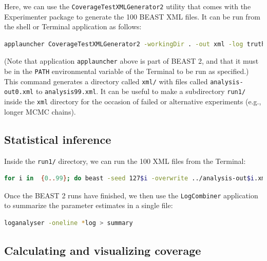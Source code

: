 \documentclass[oneside]{article}
\begin{document}
Here, we can use the \texttt{CoverageTestXMLGenerator2} utility that comes with the Experimenter package to generate the 100 BEAST XML files.
It can be run from the shell or Terminal application as follows:

\vspace{.25cm}

{\scriptsize
\begin{lstlisting}[language=bash]
applauncher CoverageTestXMLGenerator2 -workingDir . -out xml -log truth.log -tree truth.trees -xml input.xml 
\end{lstlisting}
}

\noindent (Note that application \texttt{applauncher} above is part of BEAST 2, and that it must be in the \texttt{PATH} environmental variable of the Terminal to be run as specified.)
This command generates a directory called \texttt{xml/} with files called \texttt{analysis-out0.xml} to \texttt{analysis99.xml}.
It can be useful to make a subdirectory \texttt{run1/} inside the \texttt{xml} directory for the occasion of failed or alternative experiments (e.g., longer MCMC chains).

\subsection{Statistical inference}

Inside the \texttt{run1/} directory, we can run the 100 XML files from the Terminal:

\vspace{.25cm}

{\scriptsize
\begin{lstlisting}[language=bash]
for i in  {0..99}; do beast -seed 127$i -overwrite ../analysis-out$i.xml > out$i 2>&1 ; done 
\end{lstlisting}
}

Once the BEAST 2 runs have finished, we then use the \texttt{LogCombiner} application to summarize the parameter estimates in a single file:

\vspace{.25cm}

{\scriptsize
\begin{lstlisting}[language=bash]
loganalyser -oneline *log > summary
\end{lstlisting}
}

\subsection{Calculating and visualizing coverage}
\end{document}
